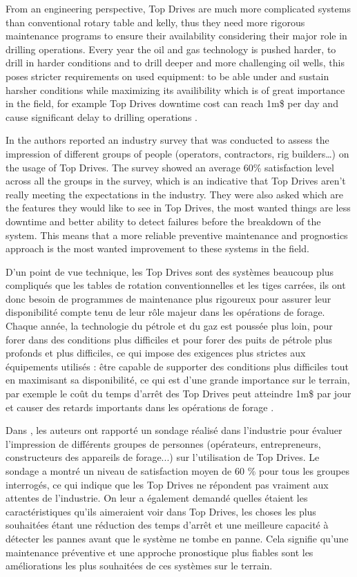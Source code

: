 From an engineering perspective, Top Drives are much more complicated systems than conventional rotary table and kelly, thus they need more rigorous maintenance programs to ensure their availability considering their major role in drilling operations. Every year the oil and gas technology is pushed harder, to drill in harder conditions and to drill deeper and more challenging oil wells, this poses stricter requirements on used equipment: to be able under and sustain harsher conditions while maximizing its availibility which is of great importance in the field, for example  Top Drives downtime cost can reach 1m\$ per day and cause significant delay to drilling operations \cite{skfbrochure}. 

In \cite{Pournazari2016} the authors reported an industry survey that was conducted to assess the impression of different groups of people (operators, contractors, rig builders…) on the usage of Top Drives. The survey showed an average 60\% satisfaction level across all the groups in the survey, which is an indicative that Top Drives aren't really meeting the expectations in the industry. They were also asked which are the features they would like to see in Top Drives, the most wanted things are less downtime and better ability to detect failures before the breakdown of the system. This means that a more reliable preventive maintenance and prognostics approach is the most wanted improvement to these systems in the field.

D'un point de vue technique, les Top Drives sont des systèmes beaucoup plus compliqués que les tables de rotation conventionnelles et les tiges carrées, ils ont donc besoin de programmes de maintenance plus rigoureux pour assurer leur disponibilité compte tenu de leur rôle majeur dans les opérations de forage. Chaque année, la technologie du pétrole et du gaz est poussée plus loin, pour forer dans des conditions plus difficiles et pour forer des puits de pétrole plus profonds et plus difficiles, ce qui impose des exigences plus strictes aux équipements utilisés : être capable de supporter des conditions plus difficiles tout en maximisant sa disponibilité, ce qui est d'une grande importance sur le terrain, par exemple le coût du temps d'arrêt des Top Drives peut atteindre 1m\$ par jour et causer des retards importants dans les opérations de forage \cite{skfbrochure}. 

Dans \cite{Pournazari2016}, les auteurs ont rapporté un sondage réalisé dans l'industrie pour évaluer l'impression de différents groupes de personnes (opérateurs, entrepreneurs, constructeurs des appareils de forage...) sur l'utilisation de Top Drives. Le sondage a montré un niveau de satisfaction moyen de 60 \% pour tous les groupes interrogés, ce qui indique que les Top Drives ne répondent pas vraiment aux attentes de l'industrie. On leur a également demandé quelles étaient les caractéristiques qu'ils aimeraient voir dans Top Drives, les choses les plus souhaitées étant une réduction des temps d'arrêt et une meilleure capacité à détecter les pannes avant que le système ne tombe en panne. Cela signifie qu'une maintenance préventive et une approche pronostique plus fiables sont les améliorations les plus souhaitées de ces systèmes sur le terrain.

